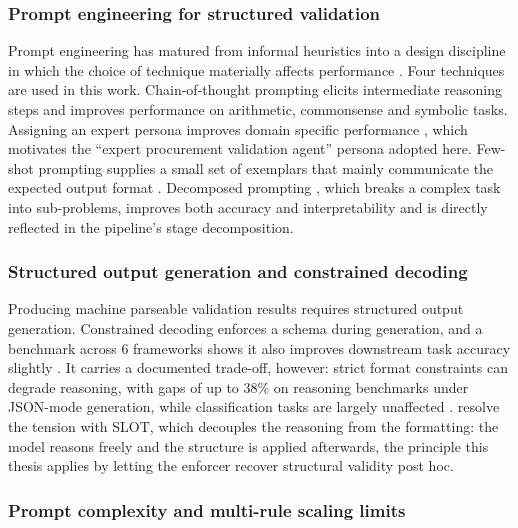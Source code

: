 \subsubsection{Prompt engineering for structured validation}

Prompt engineering has matured from informal heuristics into a design discipline in which the choice of technique materially affects performance \citep{schulhoff2024, sahoo2024}. Four techniques are used in this work. Chain-of-thought prompting \citep{wei2022} elicits intermediate reasoning steps and improves performance on arithmetic, commonsense and symbolic tasks. Assigning an expert persona improves domain specific performance \citep{salewski2024}, which motivates the ``expert procurement validation agent'' persona adopted here. Few-shot prompting \citep{brown2020} supplies a small set of exemplars that mainly communicate the expected output format \citep{min2022}. Decomposed prompting \citep{khot2023}, which breaks a complex task into sub-problems, improves both accuracy and interpretability and is directly reflected in the pipeline's stage decomposition.

\subsubsection{Structured output generation and constrained decoding}

Producing machine parseable validation results requires structured output generation. Constrained decoding enforces a schema during generation, and a benchmark across 6 frameworks shows it also improves downstream task accuracy slightly \citep{geng2025}. It carries a documented trade-off, however: strict format constraints can degrade reasoning, with gaps of up to 38\% on reasoning benchmarks under JSON-mode generation, while classification tasks are largely unaffected \citep{tam2024}. \citet{wang2025slot} resolve the tension with SLOT, which decouples the reasoning from the formatting: the model reasons freely and the structure is applied afterwards, the principle this thesis applies by letting the enforcer recover structural validity post hoc.

\subsubsection{Prompt complexity and multi-rule scaling limits}
\label{sec:lr:density}


